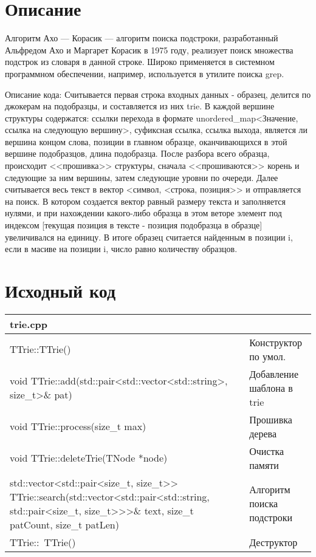 \section{Описание}
Алгоритм Ахо — Корасик — алгоритм поиска подстроки, разработанный Альфредом Ахо и Маргарет Корасик в 1975 году, 
реализует поиск множества подстрок из словаря в данной строке. 
Широко применяется в системном программном обеспечении, например, используется в утилите поиска grep.


Описание кода: Считывается первая строка входных данных - образец, делится по джокерам на подобразцы, и составляется из
 них trie. 
В каждой вершине структуры содержатся: ссылки перехода в формате unordered\_map<Значение, ссылка на следующую вершину>, 
суфиксная 
ссылка, ссылка выхода, является ли вершина концом слова, позиции в главном образце, оканчивающихся в этой вершине 
подобразцов, длина подобразца.
После разбора всего образца, происходит <<прошивка>>  структуры, сначала <<прошиваются>> корень и следующие за ним 
вершины,
затем следующие уровни по очереди.
Далее считывается весь текст в вектор <символ, <строка, позиция>> и отправляется на поиск.
В котором создается вектор равный размеру текста и заполняется нулями, и при нахождении какого-либо образца в этом 
веторе элемент под индексом [текущая позиция в тексте - позиция подобразца в образце] увеличивался на единицу.
В итоге образец считается найденным в позиции i, если в масиве на позиции i, число равно количеству образцов.
\pagebreak

\section{Исходный код}

\begin{longtable}{|p{10.5cm}|p{4.5cm}|}
	\hline
	\rowcolor{lightgray}
	\multicolumn{2}{|c|} {trie.cpp}\\
	\hline
	TTrie::TTrie() & Конструктор по умол.\\
	\hline
	void TTrie::add(std::pair<std::vector<std::string>, size\_t>\& pat) & Добавление шаблона в trie\\
	\hline
	void TTrie::process(size\_t max) & Прошивка дерева\\
	\hline
	void TTrie::deleteTrie(TNode *node) & Очистка памяти\\
	\hline
	std::vector<std::pair<size\_t, size\_t>> TTrie::search(std::vector<std::pair<std::string, std::pair<size\_t, size\_t>>>\& text, size\_t patCount, size\_t patLen) & Алгоритм поиска подстроки\\
	\hline
	TTrie::~TTrie() & Деструктор\\
	\hline
\end{longtable}

